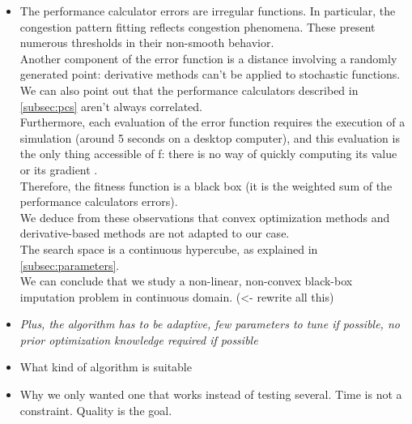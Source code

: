 \color{black}
\begin{itemize}
	\item The performance calculator errors are irregular functions. In particular, the congestion pattern fitting reflects congestion phenomena. These present numerous thresholds in their non-smooth behavior.\\
Another component of the error function is a distance involving a randomly generated point: derivative methods can't be applied to stochastic functions. We can also point out that the performance calculators described in \ref{subsec:pcs} aren't always correlated.\\
Furthermore, each evaluation of the error function requires the execution of a simulation (around 5 seconds on a desktop computer), and this evaluation is the only thing accessible of f: there is no way of quickly computing its value or its gradient .\\
Therefore, the fitness function is a black box (it is the weighted sum of the performance calculators errors).\\
We deduce from these observations that convex optimization methods and derivative-based methods are not adapted to our case.\\
The search space is a continuous hypercube, as explained in \ref{subsec:parameters}.\\
We can conclude that we study a non-linear, non-convex black-box imputation problem in continuous domain. 	\color{red}
(<- rewrite all this)	\color{black}

	\item \emph{Plus, the algorithm has to be adaptive, few parameters to tune if possible, no prior optimization knowledge required if possible}
	\item What kind of algorithm is suitable
	\item Why we only wanted one that works instead of testing several. Time is not a constraint. Quality is the goal.
\end{itemize}